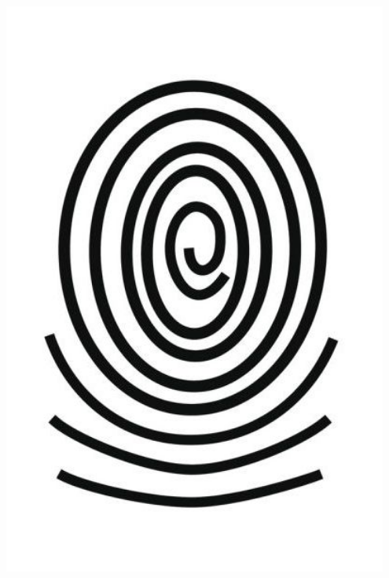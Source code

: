 \documentclass[letter]{amsart}
\begin{document}
\begin{minipage}[H]{0.33\textwidth}
    \centering
    \includegraphics[width=0.95\textwidth]{fingerprintWHORL.jpeg}
\end{minipage}
\end{document}
